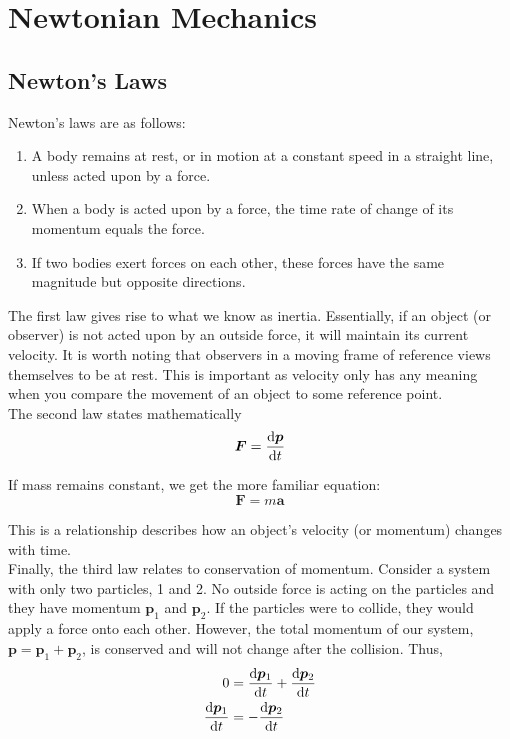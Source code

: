 \documentclass[oneside]{book}
\numberwithin{figure}{section}
\numberwithin{equation}{section}
\theoremstyle{definition}
\begin{document}
	\chapter{Newtonian Mechanics}
	\section{Newton's Laws}
	Newton's laws are as follows:
	\begin{enumerate}
		\item A body remains at rest, or in motion at a constant speed in a straight line, unless acted upon by a force.

		\item When a body is acted upon by a force, the time rate of change of its momentum equals the force.

		\item If two bodies exert forces on each other, these forces have the same magnitude but opposite directions.
	\end{enumerate}
	
	The first law gives rise to what we know as inertia. Essentially, if an object (or observer) is not acted upon by an outside force, it will maintain its current velocity. It is worth noting that observers in a moving frame of reference views themselves to be at rest. This is important as velocity only has any meaning when you compare the movement of an object to some reference point.\\
	
	The second law states mathematically
	\begin{equation}\label{eq:n2}
		\bm{F} = \dv{\bm{p}}{t}
	\end{equation}
	
	If mass remains constant, we get the more familiar equation:
	\begin{equation}
		\bm{F} = m\bm{a}
	\end{equation}
	
	This is a relationship describes how an object's velocity (or momentum) changes with time.\\

	Finally, the third law relates to conservation of momentum. Consider a system with only two particles, 1 and 2. No outside force is acting on the particles and they have momentum $ \bm{p}_1 $ and $ \bm{p}_2 $. If the particles were to collide, they would apply a force onto each other. However, the total momentum of our system, $ \bm{p} = \bm{p}_1 + \bm{p}_2 $, is conserved and will not change after the collision. Thus,
	\begin{align}
		0 &= \dv{\bm{p}_1}{t} + \dv{\bm{p}_2}{t}\\
		\dv{\bm{p}_1}{t} &= -\dv{\bm{p}_2}{t}
	\end{align}
	
\end{document}
